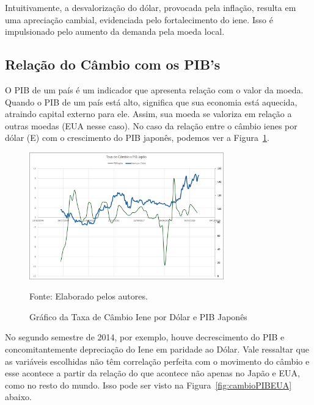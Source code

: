 \documentclass[a4paper,12pt]{article}[abntex2]
\begin{document}
Intuitivamente, a desvalorização do dólar, provocada pela inflação, resulta em uma apreciação cambial, evidenciada pelo fortalecimento do iene. Isso é impulsionado pelo aumento da demanda pela moeda local.

\subsection{\textbf{Relação do Câmbio com os PIB's}}

O PIB de um país é um indicador que apresenta relação com o valor da moeda. Quando o PIB de um país está alto, significa que sua economia está aquecida, atraindo capital externo para ele. Assim, sua moeda se valoriza em relação a outras moedas (EUA nesse caso). No caso da relação entre o câmbio ienes por dólar (E) com o crescimento do PIB japonês, podemos ver a Figura~\ref{fig:cambioPIBJapão}.

\begin{figure}[H]
    \centering
    \caption{Gráfico da Taxa de Câmbio Iene por Dólar e PIB Japonês} 
    \includegraphics[width=0.75\textwidth]{PIB Japão.png}
    \label{fig:cambioPIBJapão}
    
    \footnotesize{Fonte: Elaborado pelos autores.}
    \end{figure}

No segundo semestre de 2014, por exemplo, houve decrescimento do PIB e concomitantemente depreciação do Iene em paridade ao Dólar. Vale ressaltar que as variáveis escolhidas não têm correlação perfeita com o movimento do câmbio e esse acontece a partir da relação do que acontece não apenas no Japão e EUA, como no resto do mundo. Isso pode ser visto na Figura~\ref{fig:cambioPIBEUA} abaixo. 
\end{document}
